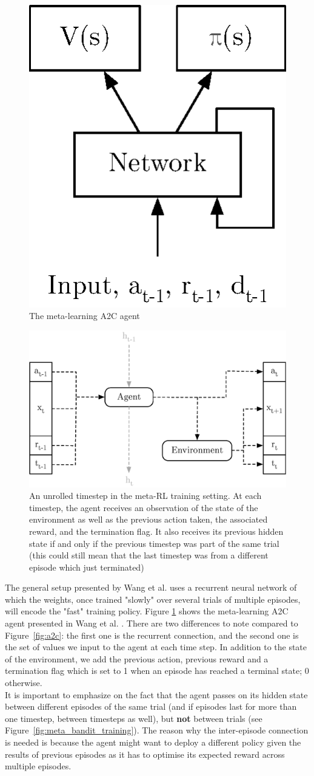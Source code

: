\begin{figure}
	\centering
	\includegraphics[width=0.2\linewidth]{fig/a2c_meta.eps}
	\caption{The meta-learning A2C agent}
	\label{fig:a2c_meta}
\end{figure}

\begin{figure}
	\centering
	\includegraphics[width=0.6\linewidth]{fig/meta_rl_timestep.eps}
	\caption{An unrolled timestep in the meta-RL training setting. At each
	timestep, the agent receives an observation of the state of the
	environment as well as the previous action taken, the associated reward,
	and the termination flag. It also receives its previous hidden state
	if and only if the previous timestep was part of the same trial (this
	could still mean that the last timestep was from a different episode
	which just terminated)}
	\label{fig:meta_rl_timestep}
\end{figure}

The general setup presented by Wang et al. uses a recurrent neural network of
which the weights, once trained "slowly" over several trials of multiple
episodes, will encode the "fast" training policy.
Figure \ref{fig:a2c_meta} shows the meta-learning A2C agent presented in Wang
et al. \cite{learningtorl}. There are two differences to note compared to
Figure~\ref{fig:a2c}: the first one is the recurrent connection, and the
second one is the set of values we input to the agent at each time step. In
addition to the state of the environment, we add the previous action, 
previous reward and a termination flag which is set to 1 when an episode
has reached a terminal state; 0 otherwise.\\

It is important to emphasize on the fact that the agent passes on its hidden
state between different episodes of the same trial (and if episodes last for
more than one timestep, between timesteps as well), but \textbf{not} between
trials (see Figure~\ref{fig:meta_bandit_training}).
The reason why the inter-episode connection is needed is because
the agent might want to deploy a different policy given the results of 
previous episodes as it has to optimise its expected reward across multiple
episodes.

